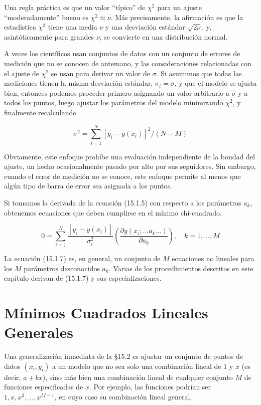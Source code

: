 \documentclass[10pt,a4paper]{book}
\begin{document}
Una regla práctica es que un valor “típico” de $\chi^2$ para un ajuste “moderadamente” bueno es $\chi^2 \approx \nu$. Más precisamente, la afirmación es que la estadística $\chi^2$ tiene una media $\nu$ y una desviación estándar $\sqrt{2\nu}$, y, asintóticamente para grandes $\nu$, se convierte en una distribución normal.

A veces los científicos usan conjuntos de datos con un conjunto de errores de medición que no se conocen de antemano, y las consideraciones relacionadas con el ajuste de $\chi^2$ se usan para derivar un valor de $\sigma$. Si asumimos que todas las mediciones tienen la misma desviación estándar, $\sigma_i = \sigma$, y que el modelo se ajusta bien, entonces podemos proceder primero asignando un valor arbitrario a $\sigma$ y a todos los puntos, luego ajustar los parámetros del modelo minimizando $\chi^2$, y finalmente recalculando

\begin{equation}
\sigma^2 = \sum_{i=1}^{N} [y_i - y(x_i)]^2 / (N - M)
\tag{15.1.6}
\end{equation}

Obviamente, este enfoque prohíbe una evaluación independiente de la bondad del ajuste, un hecho ocasionalmente pasado por alto por sus seguidores. Sin embargo, cuando el error de medición no se conoce, este enfoque permite al menos que algún tipo de barra de error sea asignada a los puntos.

Si tomamos la derivada de la ecuación (15.1.5) con respecto a los parámetros $a_k$, obtenemos ecuaciones que deben cumplirse en el mínimo chi-cuadrado,

\begin{equation}
0 = \sum_{i=1}^{N} \frac{[y_i - y(x_i)]}{\sigma_i^2}
\left( \frac{\partial y(x_i; \ldots a_k \ldots)}{\partial a_k} \right), \quad
k = 1, \ldots, M
\tag{15.1.7}
\end{equation}

La ecuación (15.1.7) es, en general, un conjunto de $M$ ecuaciones no lineales para los $M$ parámetros desconocidos $a_k$. Varias de los procedimientos descritos en este capítulo derivan de (15.1.7) y sus especializaciones.

\newpage

\section{Mínimos Cuadrados Lineales Generales}

Una generalización inmediata de la §15.2 es ajustar un conjunto de puntos de datos $(x_i, y_i)$ a un modelo que no sea solo una combinación lineal de $1$ y $x$ (es decir, $a + bx$), sino más bien una combinación lineal de cualquier conjunto $M$ de funciones especificadas de $x$. Por ejemplo, las funciones podrían ser $1, x, x^2, \ldots, x^{M-1}$, en cuyo caso su combinación lineal general,
\end{document}
